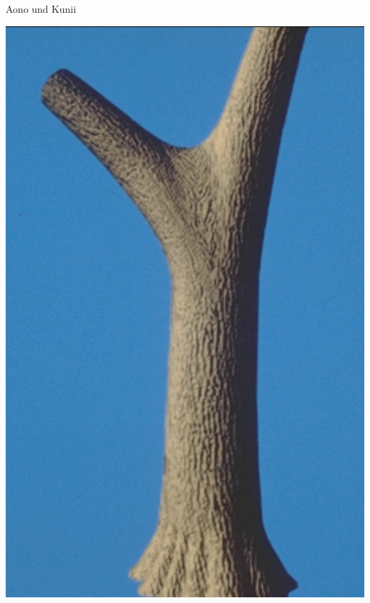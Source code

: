 \begin{center}
\begin{minipage}[c]{0.45\textwidth}
		Aono und Kunii \cite{ABOP:04}
	\end{minipage}
\end{center}


\begin{center}
	\vfill
	\begin{minipage}[c]{0.45\textwidth}
		\centering
		\includegraphics[height=0.6\textheight]{images/CH1_Bloomenthal1.png}
		

\end{minipage}
\end{center}
